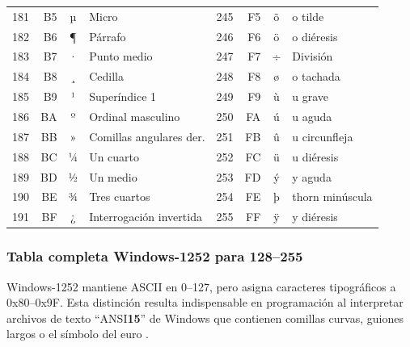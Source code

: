 \documentclass[12pt,twoside]{book}
\begin{document}
\begin{longtable}{r r c l r r c l}
						181 & B5 & µ & Micro & 245 & F5 & õ & o tilde \\
						182 & B6 & ¶ & Párrafo & 246 & F6 & ö & o diéresis \\
						183 & B7 & · & Punto medio & 247 & F7 & ÷ & División \\
						184 & B8 & ¸ & Cedilla & 248 & F8 & ø & o tachada \\
						185 & B9 & ¹ & Superíndice 1 & 249 & F9 & ù & u grave \\
						186 & BA & º & Ordinal masculino & 250 & FA & ú & u aguda \\
						187 & BB & » & Comillas angulares der. & 251 & FB & û & u circunfleja \\
						188 & BC & ¼ & Un cuarto & 252 & FC & ü & u diéresis \\
						189 & BD & ½ & Un medio & 253 & FD & ý & y aguda \\
						190 & BE & ¾ & Tres cuartos & 254 & FE & þ & thorn minúscula \\
						191 & BF & ¿ & Interrogación invertida & 255 & FF & ÿ & y diéresis \\
					\end{longtable}					
				
				\subsubsection*{Tabla completa Windows-1252 para 128--255}
					\noindent
					Windows-1252 mantiene ASCII en 0--127, pero asigna caracteres tipográficos a 0x80--0x9F. Esta distinción resulta indispensable en programación al interpretar archivos de texto ``ANSI\textbf{15}'' de Windows que contienen comillas curvas, guiones largos o el símbolo del euro \cite{Microsoft2021CodePage,Unicode2025Standard}.
					
\end{document}
